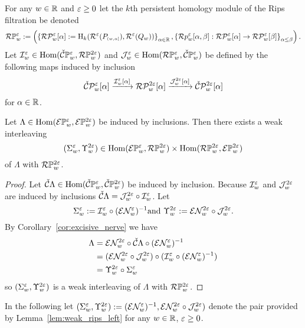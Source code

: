 For any $w\in\R$ and $\e\geq 0$ let the $k$th persistent homology module of the Rips filtration be denoted
\[\RPP{w}{\e} := \left(\left\{\RP{w}{\e}{\alpha} := \hom_k(\rips^\e(P\subi{w,\alpha}),\rips^\e(Q_w))\right\}_{\alpha\in\R}, \left\{\rips p_w^\e[\alpha,\beta] : \RP{w}{\e}{\alpha}\to\RP{w}{\e}{\beta}\right\}_{\alpha\leq\beta}\right).\]
Let $\I_w^\e\in\Hom(\CPP{w}{\e}, \RPP{w}{2\e})$ and $\J_w^\e\in\Hom(\RPP{w}{\e},\CPP{w}{\e})$ be defined by the following maps induced by inclusion
\[ \CP{w}{\e}{\alpha}\xrightarrow{\I_w^\e[\alpha]} \RP{w}{2\e}{\alpha}\xrightarrow{\J_w^{2\e}[\alpha]}\CP{w}{2\e}{\alpha}\]
for $\alpha\in\R$.


\begin{lemma}\label{lem:weak_rips_left}
  Let $\Lambda\in\Hom(\ext{\PP{w}{\e}}, \ext{\PP{w}{2\e}})$ be induced by inclusions.
  Then there exists a weak interleaving
  \[ (\Sigma_w^\e, \Upsilon_w^{2\e})\in \Hom(\ext{\PP{w}{\e}}, \RPP{w}{2\e})\times \Hom(\RPP{w}{2\e},\ext{\PP{w}{2\e}})\]
  of $\Lambda$ with $\RPP{w}{2\e}$.
\end{lemma}
\begin{proof}
  Let $\cech\Lambda\in\Hom(\CPP{w}{\e},\CPP{w}{2\e})$ be induced by inclusion.
  Because $\I_w^\e$ and $\J_w^{2\e}$ are induced by inclusions $\cech\Lambda = \J_w^{2\e}\circ \I_w^\e$.
  Let
  \[ \Sigma_w^\e := \I_w^\e\circ (\E\N_w^\e)^{-1}\text{and}\ \Upsilon_w^{2\e} := \E\N_w^{2\e}\circ \J_w^{2\e}.\]
  By Corollary~\ref{cor:excisive_nerve} we have
  \begin{align*}
    \Lambda &= \E\N_w^{2\e}\circ \cech\Lambda\circ (\E\N_w^\e)^{-1}\\
      &= (\E\N_w^{2\e}\circ \J_w^{2\e})\circ (\I_w^\e\circ (\E\N_w^\e)^{-1})\\
      &= \Upsilon_w^{2\e}\circ \Sigma_w^\e
  \end{align*}
  so $(\Sigma_w^\e, \Upsilon_w^{2\e})$ is a weak interleaving of $\Lambda$ with $\RPP{w}{2\e}$.
\end{proof}

In the following let $(\Sigma_w^\e, \Upsilon_w^{2\e}) := (\E\N_w^\e)^{-1}, \E\N_w^{2\e}\circ \J_w^{2\e})$ denote the pair provided by Lemma~\ref{lem:weak_rips_left} for any $w\in\R$, $\e\geq 0$.


